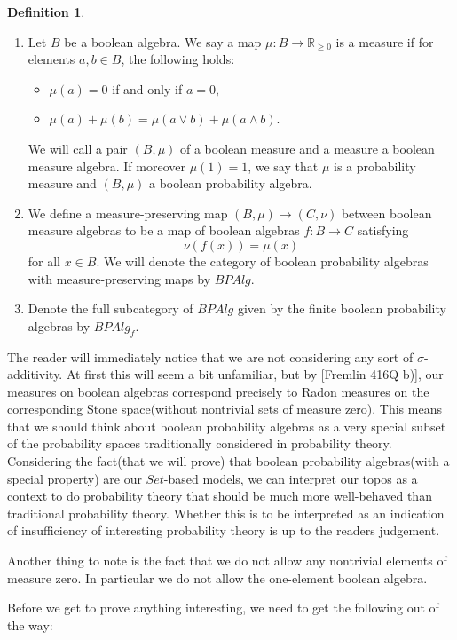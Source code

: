 \documentclass[a4paper]{amsproc}
\theoremstyle{plain}
\theoremstyle{definition}
\newtheorem{definition}{Definition}[section]
\theoremstyle{remark}
\numberwithin{equation}{section}
\begin{document}
\begin{definition}
\begin{enumerate}
\item Let $B$ be a boolean algebra. We say a map $\mu: B \to \mathbb{R}_{\geq 0}$ is a measure if for elements $a,b \in B$, the following holds:
\begin{itemize}
\item $\mu(a) = 0$ if and only if $a = 0 $,
\item $\mu(a) + \mu(b) = \mu(a \vee b) + \mu(a \wedge b)$.
\end{itemize}
We will call a pair $(B, \mu)$ of a boolean measure and a measure a boolean measure algebra. If moreover $\mu(1) = 1$, we say that $\mu$ is a  probability measure and $(B,\mu)$ a boolean probability algebra.
\item We define a measure-preserving map $(B, \mu) \to (C, \nu)$ between boolean measure algebras to be a map of boolean algebras $f: B \to C$ satisfying
\[
\nu(f(x)) = \mu(x)
\]
for all $x \in B$. We will denote the category of boolean probability algebras with measure-preserving maps by $BPAlg$.
\item Denote the full subcategory of $BPAlg$ given by the finite boolean probability algebras by $BPAlg_f$.
\end{enumerate}
\end{definition}

The reader will immediately notice that we are not considering any sort of $\sigma$-additivity. At first this will seem a bit unfamiliar, but by [Fremlin 416Q b)], our measures on boolean algebras correspond precisely to Radon measures on the corresponding Stone space(without nontrivial sets of measure zero). This means that we should think about boolean probability algebras as a very special subset of the probability spaces traditionally considered in probability theory. Considering the fact(that we will prove) that boolean probability algebras(with a special property) are our $Set$-based models, we can interpret our topos as a context to do probability theory that should be much more well-behaved than traditional probability theory. Whether this is to be interpreted as an indication of insufficiency of interesting probability theory is up to the readers judgement.

Another thing to note is the fact that we do not allow any nontrivial elements of measure zero. In particular we do not allow the one-element boolean algebra.

Before we get to prove anything interesting, we need to get the following out of the way:
\end{document}

